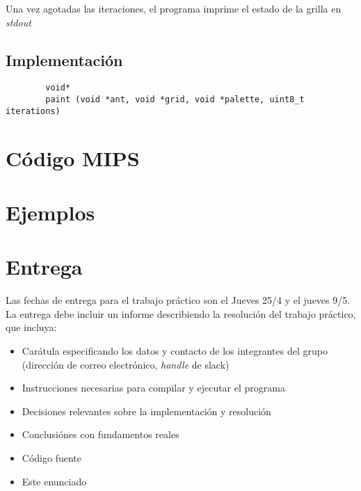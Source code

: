 \documentclass{article}
\begin{document}
Una vez agotadas las iteraciones, el programa imprime el estado de la grilla en \textit{stdout}

\subsection{Implementación}

\begin{verbatim}
        void*
        paint (void *ant, void *grid, void *palette, uint8_t iterations)
\end{verbatim}

\section{Código MIPS}

\section{Ejemplos}

\section{Entrega}

Las fechas de entrega para el trabajo práctico son el Jueves 25/4 y el jueves 9/5. La entrega debe incluir un informe
describiendo la resolución del trabajo práctico, que incluya:

\begin{itemize}
\item Carátula especificando los datos y contacto de los integrantes del grupo (dirección de correo electrónico, \textit{handle} de slack)
\item Instrucciones necesarias para compilar y ejecutar el programa
\item Decisiones relevantes sobre la implementación y resolución
\item Conclusiónes con fundamentos reales
\item Código fuente
\item Este enunciado
\end{itemize}
\end{document}
